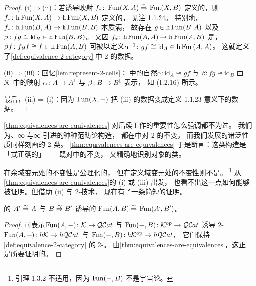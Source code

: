 \begin{proof}
(i)$\Rightarrow$(ii)：若诱导映射 $f_\ast\colon\operatorname{Fun}(X,A)\mathrel{\stackrel{\sim}{\Rightarrow}}\operatorname{Fun}(X,B)$
定义\trQuasiCategory{}的\trEquivalence{}，则\trFunctor
$f_\ast\colon\mathrm{h}\operatorname{Fun}(X,A)\to\mathrm{h}\operatorname{Fun}(X,B)$ 定义\trCategory{}的\trEquivalence{}，
见注 1.1.24。%
特别地，\trEquivalence{} $f_\ast\colon\mathrm{h}\operatorname{Fun}(B,A)\to\mathrm{h}\operatorname{Fun}(B,B)$
本质满，%
故存在 $g\in\mathrm{h}\operatorname{Fun}(B,A)$ 以及\trIsomorphism
$\beta\colon fg\cong\mathrm{id}_B\in\mathrm{h}\operatorname{Fun}(B,B)$。
又因 $f_\ast\colon\mathrm{h}\operatorname{Fun}(A,A)\to\mathrm{h}\operatorname{Fun}(A,B)$ 是\trFullyFaithful，
\trIsomorphism $\beta f\colon fgf\cong f\in\mathrm{h}\operatorname{Fun}(A,B)$
可被\trLifting{}以定义\trIsomorphism $\alpha^{-1}\colon gf\cong\mathrm{id}_A\in\mathrm{h}\operatorname{Fun}(A,A)$。
这就定义了\cref{def:equivalence-2-category} 中 2-\trCategory\trEquivalence{}的数据。

(ii)$\Rightarrow$(iii)：回忆\cref{lem:represent-2-cells}：
\trHomotopyTwoCategory{}中的自然\trIsomorphism $\alpha\colon\mathrm{id}_A\cong gf$ 与
$\beta\colon fg\cong\mathrm{id}_B$ 由 $\mathcal{K}$ 中的映射
$\alpha\colon A\to A^{\mathbb{I}}$ 与 $\beta\colon B\to B^{\mathbb{I}}$ 表示，
如 (1.2.16) 所示。%

最后，(iii)$\Rightarrow$(i)：因为 $\operatorname{Fun}(X,-)$ 把 (iii) 的数据变成定义 1.1.23
意义下\trQuasiCategory\trEquivalence{}的数据。
\end{proof}

\cref{thm:equivalences-are-equivalences} 对后续工作的重要性怎么强调都不为过。
我们为\trInfinityCategory{}、∞-\trFunctor{}与∞-\trNaturalTransformation{}引进的种种范畴论构造，
都在\trHomotopyTwoCategory{}中对 2-\trCategory{}的\trEquivalence{}不变，
而我们发展的诸泛性质同样刻画\trInfinityCategory{}的 2-\trCategory\trEquivalence{}类。
\cref{thm:equivalences-are-equivalences} 于是断言：这类构造是
「\trHomotopy{}式正确的」——既对\trInfinityCosmos{}中的\trEquivalence{}不变，
又精确地识别对象的\trEquivalence{}类。

\trFunctorSpace{}在余域变元处的\trEquivalence{}不变性是公理化的，
但在定义域变元处的\trEquivalence{}不变性则不是。%
\footnote{引理 1.3.2 不适用，因为 $\operatorname{Fun}(-,B)$ 不是宇宙论\trFunctor{}。}
从\cref{thm:equivalences-are-equivalences}的 (i) 或 (iii) 出发，
也看不出这一点如何能够被证明。但借助 (ii) 与 2-\trCategory{}技术，
现在有了一条简短的证明。

\begin{corollary}\label{cor:functor-space-equivalences}
\trInfinityCategory{}的\trEquivalence{} $A'\mathrel{\stackrel{\sim}{\Rightarrow}} A$ 与 $B\mathrel{\stackrel{\sim}{\Rightarrow}} B'$
诱导\trFunctorSpace{}的\trEquivalence{} $\operatorname{Fun}(A,B)\mathrel{\stackrel{\sim}{\Rightarrow}}\operatorname{Fun}(A',B')$。
\end{corollary}
\begin{proof}
可表示\trSimplicialFunctor $\operatorname{Fun}(A,-)\colon\mathcal{K}\to\mathcal{Q}\mathcal{C}at$ 与
$\operatorname{Fun}(-,B)\colon\mathcal{K}^{\mathrm{op}}\to\mathcal{Q}\mathcal{C}at$
诱导 2-\trFunctor $\operatorname{Fun}(A,-)\colon\hbar \mathcal{K}\to\hbar \mathcal{Q}\mathcal{C}at$ 与
$\operatorname{Fun}(-,B)\colon\hbar \mathcal{K}^{\mathrm{op}}\to\hbar \mathcal{Q}\mathcal{C}at$，
它们保持\cref{def:equivalence-2-category} 的 2-\trCategory\trEquivalence{}。
由\cref{thm:equivalences-are-equivalences}，这正是所要证明的。
\end{proof}

